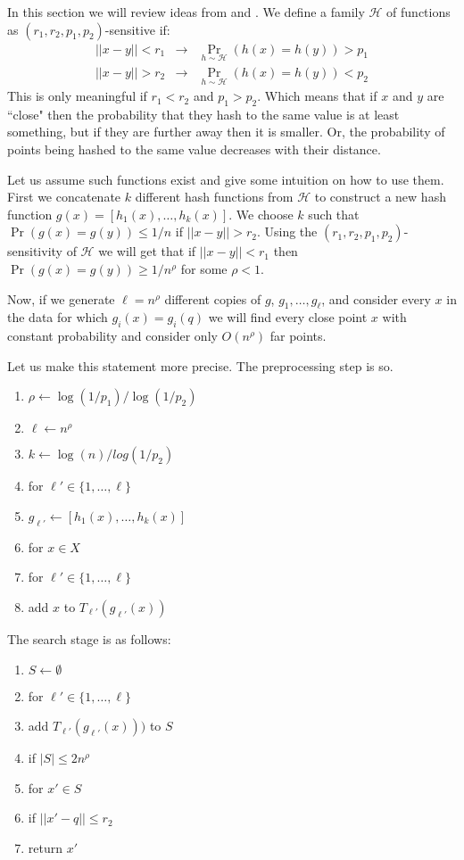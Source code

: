 \documentclass{article}
\begin{document}

In this section we will review ideas from \cite{Charikar02} and \cite{GionisIM99}.
We define a family $\mathcal{H}$
of functions as $(r_1,r_2,p_1,p_2)$-sensitive if:
\begin{eqnarray*} 
|| x- y || < r_1 &\rightarrow& \Pr_{h \sim \mathcal{H}}(h(x)=h(y)) > p_1\\
|| x- y || > r_2 &\rightarrow& \Pr_{h \sim \mathcal{H}}(h(x)=h(y)) < p_2
\end{eqnarray*}
This is only meaningful if $r_1 < r_2$ and $p_1 > p_2$.
Which means that if $x$ and $y$ are ``close" then the probability that
they hash to the same value is at least something, but if they are further away
then it is smaller. Or, the probability of points being hashed to the same value 
decreases with their distance.


Let us assume such functions exist and give some intuition on how to use them.
First we concatenate $k$ different hash functions from $\mathcal{H}$ 
to construct a new hash function $g(x) = [h_1(x),\ldots,h_k(x)]$.
We choose $k$ such that $\Pr(g(x)=g(y)) \le 1/n$ if $||x-y|| > r_2$.
Using the $(r_1,r_2,p_1,p_2)$-sensitivity of $\mathcal{H}$ we will get that
if $||x-y|| < r_1$ then $\Pr(g(x)=g(y)) \ge 1/n^{\rho}$ for some $\rho<1$.

Now, if we generate $\ell = n^{\rho}$ different copies of $g$, $g_1,\ldots,g_\ell$,
and consider every $x$ in the data for which $g_i(x)=g_i(q)$ we will 
find every close point $x$ with constant probability and consider only $O(n^\rho)$ far points.

Let us make this statement more precise.
The preprocessing step is so.
\begin{enumerate}
\item $\rho \leftarrow \log(1/p_1)/\log(1/p_2)$
\item $\ell \leftarrow n^{\rho}$
\item $k \leftarrow \log(n)/log(1/p_2)$
\item for $\ell' \in \{1,\ldots,\ell\}$
\item \tab $g_{\ell'} \leftarrow [h_1(x),\ldots,h_k(x)]$
\item for $x \in X$
\item \tab for $\ell' \in \{1,\ldots,\ell\} $
\item \tab \tab add $x$ to $T_{\ell'}(g_{\ell'}(x))$
\end{enumerate}

The search stage is as follows:
\begin{enumerate}
\item $S \leftarrow \emptyset$
\item for $\ell' \in \{1,\ldots,\ell\} $
\item  \tab add $T_{\ell'}(g_{\ell'}(x)))$ to $S$
\item if $|S| \le 2n^{\rho}$
\item \tab for $x' \in S$
\item \tab  \tab if $||x' - q|| \le r_2$
\item \tab \tab \tab return  $x'$
\end{enumerate}
\end{document}
